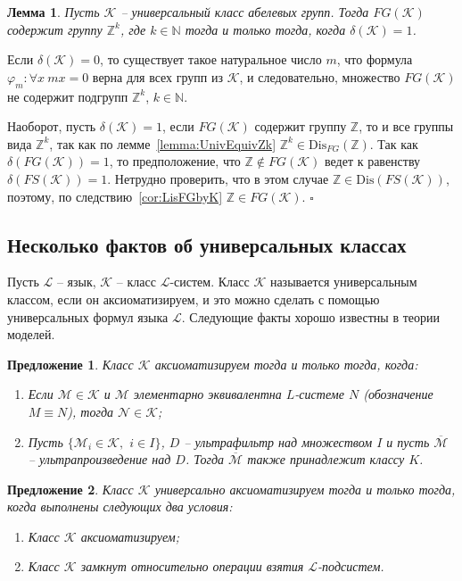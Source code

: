\documentclass[a4paper,11pt,twoside]{article}
\newtheorem{lemma}{Лемма}[section]
\newtheorem{proposition}{Предложение}[section]
\def\proof{{\noindent{\bf Доказательство.}} }
\def\K{{\mathcal{K}}}
\def\L{{\mathcal{L}}}
\def\Z{{\mathbb{Z}}}
\def\N{{\mathbb{N}}}
\def\Dis{{\mathrm{Dis}}}
\begin{document}
\begin{lemma}\label{lemma:ContainsZ}
Пусть $\K$ -- универсальный класс абелевых групп. Тогда $FG(\K)$ содержит группу $\Z^k$, где $k \in \N$ тогда и только тогда, когда $\delta(\K)=1$.
\end{lemma}

\proof Если $\delta(\K) = 0$, то существует такое натуральное число $m$, что формула $\varphi_m : \forall x \ mx = 0$ верна для всех групп из $\K$, и следовательно, множество $FG(\K)$ не содержит подгрупп $\Z^k$, $k \in \N$.

Наоборот, пусть $\delta(\K) = 1$, если $FG(\K)$ содержит группу $\Z$, то и все группы вида $\Z^k$, так как по лемме~\ref{lemma:UnivEquivZk} $\Z^k \in \Dis_{FG}(\Z)$. Так как $\delta(FG(\K)) = 1$, то предположение, что $\Z \notin FG(\K)$ ведет к равенству $\delta(FS(\K)) = 1$. Нетрудно проверить, что в этом случае $\Z \in \Dis(FS(\K))$, поэтому, по следствию~\ref{cor:LisFGbyK} $\Z \in FG(\K)$. $\square$



\subsection{Несколько фактов об универсальных классах}

Пусть $\L$ -- язык, $\K$ -- класс $\L$-систем. Класс $\K$ называется универсальным классом, если он аксиоматизируем, и это можно сделать с помощью универсальных формул языка $\L$. Следующие факты хорошо известны в теории моделей.

\begin{proposition}\label{prop:AxiomClass}
Класс $\K$ аксиоматизируем тогда и только тогда, когда:
\begin{enumerate}
\item Если $\mathcal{M} \in \K$ и $\mathcal{M}$ элементарно эквивалентна $L$-системе $N$ (обозначение $M \equiv N$), тогда $\mathcal{N} \in \K$;
\item Пусть $\{\mathcal{M}_i \in \K,$ $i \in I\}$, $D$ -- ультрафильтр над множеством $I$ и пусть $\overline{\mathcal{M}}$ -- ультрапроизведение над $D$. Тогда $\overline{\mathcal{M}}$ также принадлежит классу $K$.
\end{enumerate}
\end{proposition}

\begin{proposition}\label{prop:AxiomClass2}
Класс $\K$ универсально аксиоматизируем тогда и только тогда, когда выполнены следующих два условия:
\begin{enumerate}
\item Класс $\K$ аксиоматизируем;
\item Класс $\K$ замкнут относительно операции взятия $\L$-подсистем.
\end{enumerate}
\end{proposition}
\end{document}

